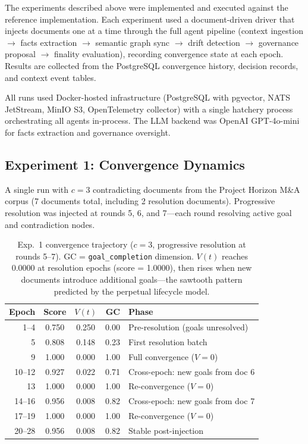 \documentclass[11pt]{article}
\begin{document}
The experiments described above were implemented and executed against the reference implementation. Each experiment used a document-driven driver that injects documents one at a time through the full agent pipeline (context ingestion $\rightarrow$ facts extraction $\rightarrow$ semantic graph sync $\rightarrow$ drift detection $\rightarrow$ governance proposal $\rightarrow$ finality evaluation), recording convergence state at each epoch. Results are collected from the PostgreSQL convergence history, decision records, and context event tables.

All runs used Docker-hosted infrastructure (PostgreSQL with pgvector, NATS JetStream, MinIO S3, OpenTelemetry collector) with a single hatchery process orchestrating all agents in-process. The LLM backend was OpenAI GPT-4o-mini for facts extraction and governance oversight.

\subsection{Experiment 1: Convergence Dynamics}

A single run with $c = 3$ contradicting documents from the Project Horizon M\&A corpus (7 documents total, including 2 resolution documents). Progressive resolution was injected at rounds 5, 6, and 7---each round resolving active goal and contradiction nodes.

\begin{table}[H]
\centering
\small
\begin{tabular}{rccrl}
\toprule
\textbf{Epoch} & \textbf{Score} & \textbf{$V(t)$} & \textbf{GC} & \textbf{Phase} \\
\midrule
1--4   & 0.750 & 0.250 & 0.00 & Pre-resolution (goals unresolved) \\
5      & 0.808 & 0.148 & 0.23 & First resolution batch \\
9      & 1.000 & 0.000 & 1.00 & Full convergence ($V = 0$) \\
10--12 & 0.927 & 0.022 & 0.71 & Cross-epoch: new goals from doc 6 \\
13     & 1.000 & 0.000 & 1.00 & Re-convergence ($V = 0$) \\
14--16 & 0.956 & 0.008 & 0.82 & Cross-epoch: new goals from doc 7 \\
17--19 & 1.000 & 0.000 & 1.00 & Re-convergence ($V = 0$) \\
20--28 & 0.956 & 0.008 & 0.82 & Stable post-injection \\
\bottomrule
\end{tabular}
\caption{Exp.~1 convergence trajectory ($c = 3$, progressive resolution at rounds 5--7). GC = \texttt{goal\_completion} dimension. $V(t)$ reaches 0.0000 at resolution epochs (score = 1.0000), then rises when new documents introduce additional goals---the sawtooth pattern predicted by the perpetual lifecycle model.}
\label{tab:exp1-results}
\end{table}
\end{document}
